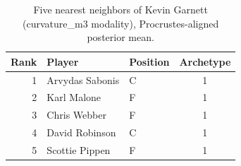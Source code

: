 \begin{table}[htbp]
  \centering\small
  \begin{tabular}{rllc}
    \toprule
    Rank & Player & Position & Archetype \\
    \midrule
    1 & Arvydas Sabonis & C & 1 \\
    2 & Karl Malone & F & 1 \\
    3 & Chris Webber & F & 1 \\
    4 & David Robinson & C & 1 \\
    5 & Scottie Pippen & F & 1 \\
    \bottomrule
  \end{tabular}
  \caption{Five nearest neighbors of Kevin Garnett (curvature_m3 modality), Procrustes-aligned posterior mean.}
  \label{tab:Kevin_Garnett_neighbors_curvature_m3}
\end{table}

